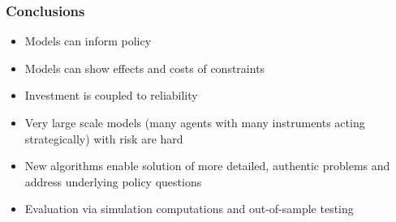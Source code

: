 \documentclass[xcolor=dvipsnames]{beamer}
\newcommand{\exclude}[1]{}
\begin{document}
\exclude{
\begin{frame}
  \frametitle{Technologies (chance constraints):
    cf. increased uptake}

\centering
Force zero emissions in at least 50\% of years (normal hydrology)\\
\texttt{[image: ../includes/SccConstraint.png]}
\texttt{[image: ../includes/SccConstraintv20.png]}\\
  \texttt{[image: ../includes/CCvalues.png]}\qquad
  \texttt{[image: ../includes/CCvaluesv20.png]}\\

  Nonzero CO$_{2}$ emissions in 6 out of the 13 scenarios\\
  Average level of CO$_{2}$ emissions (0.138 Mt) or approx 95.4\% redn

\end{frame}
}

\begin{frame}
  \frametitle{Conclusions}
  \begin{itemize}
  \item Models can inform policy
  \item Models can show effects and costs of constraints
  \item Investment is coupled to reliability
  \item \color{black} Very large scale models (many agents with many instruments
    acting strategically) with risk are hard
  \item \alert{New algorithms enable solution of more detailed,
      authentic problems and address underlying policy questions}
  \item Evaluation via simulation computations and out-of-sample testing
  \end{itemize}
\end{frame}
\end{document}
